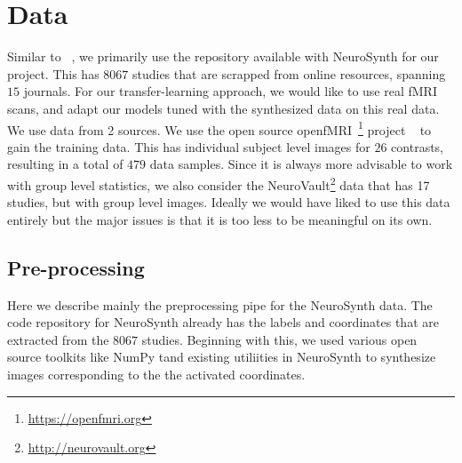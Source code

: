 \documentclass{article} %
\begin{document}
\section{Data}\label{sec:data}
Similar to ~\cite{yarkoni2011large}, we primarily use the repository available with NeuroSynth for our project. This has $8067$ studies that are scrapped from online resources, spanning $15$ journals. For our transfer-learning approach, we would like to use real fMRI scans, and adapt our models tuned with the synthesized data on this real data. We use data from 2 sources. We use the open source openfMRI~\footnote{\protect \url{https://openfmri.org}} project ~\cite{poldrack2013toward} to gain the training data. This has individual subject level images for $26$ contrasts, resulting in a total of $479$ data samples. Since it is always more advisable to work with group level statistics, we also consider the NeuroVault\footnote{\protect \url{http://neurovault.org}} data that has 17 studies, but with group level images. Ideally we would have liked to use this data entirely but the major issues is that it is too less to be meaningful on its own. 
\subsection{Pre-processing}
\label{sec:preprocess}
Here we describe mainly the preprocessing pipe for the NeuroSynth data. The code repository for NeuroSynth already has the labels and coordinates that are extracted from the $8067$ studies. Beginning with this, we used various open source toolkits like NumPy tand existing utiliities in NeuroSynth to synthesize images corresponding to the the activated coordinates. 
\end{document}
